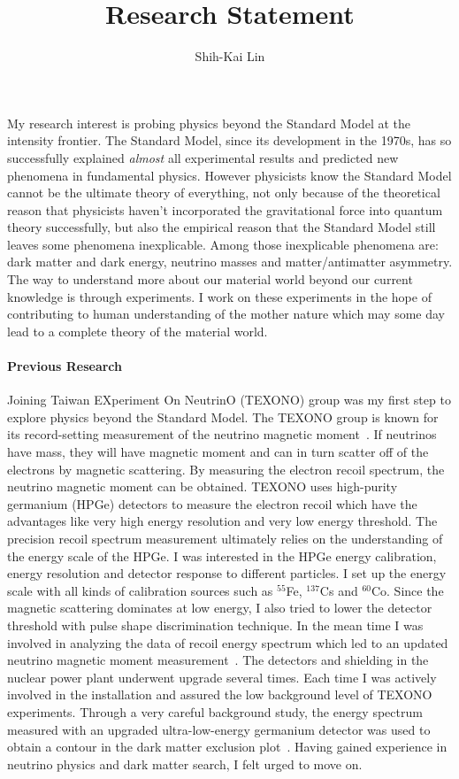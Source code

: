 \documentclass[11pt]{article}
\title{Research Statement}
\author{Shih-Kai Lin}
\date{}
\begin{document}
\maketitle

My research interest is probing physics beyond the Standard Model at the intensity frontier. The Standard Model, since its development in the 1970s, has so successfully explained \emph{almost} all experimental results and predicted new phenomena in fundamental physics. However physicists know the Standard Model cannot be the ultimate theory of everything, not only because of the theoretical reason that physicists haven't incorporated the gravitational force into quantum theory successfully, but also the empirical reason that the Standard Model still leaves some phenomena inexplicable. Among those inexplicable phenomena are: dark matter and dark energy, neutrino masses and matter/antimatter asymmetry. The way to understand more about our material world beyond our current knowledge is through experiments. I work on these experiments in the hope of contributing to human understanding of the mother nature which may some day lead to a complete theory of the material world.

\paragraph*{Previous Research}

Joining Taiwan EXperiment On NeutrinO (TEXONO) group was my first step to explore physics beyond the Standard Model. The TEXONO group is known for its record-setting measurement of the neutrino magnetic moment~\cite{HBL2003}. If neutrinos have mass, they will have magnetic moment and can in turn scatter off of the electrons by magnetic scattering. By measuring the electron recoil spectrum, the neutrino magnetic moment can be obtained. TEXONO uses high-purity germanium (HPGe) detectors to measure the electron recoil which have the advantages like very high energy resolution and very low energy threshold. The precision recoil spectrum measurement ultimately relies on the understanding of the energy scale of the HPGe. I was interested in the HPGe energy calibration, energy resolution and detector response to different particles. I set up the energy scale with all kinds of calibration sources such as $^{55}$Fe, $^{137}$Cs and $^{60}$Co. Since the magnetic scattering dominates at low energy, I also tried to lower the detector threshold with pulse shape discrimination technique. In the mean time I was involved in analyzing the data of recoil energy spectrum which led to an updated neutrino magnetic moment measurement~\cite{HTW2007}. The detectors and shielding in the nuclear power plant underwent upgrade several times. Each time I was actively involved in the installation and assured the low background level of TEXONO experiments. Through a very careful background study, the energy spectrum measured with an upgraded ultra-low-energy germanium detector was used to obtain a contour in the dark matter exclusion plot~\cite{STL2009}. Having gained experience in neutrino physics and dark matter search, I felt urged to move on.
\end{document}
